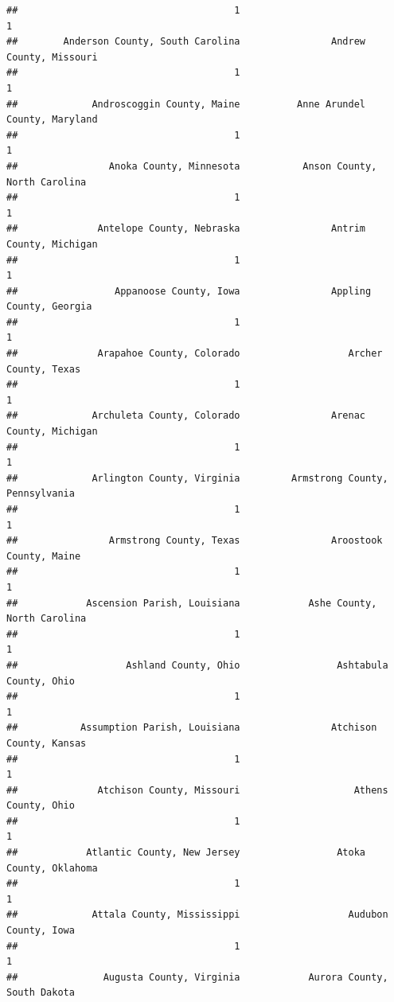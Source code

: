 \documentclass[
]{article}
\begin{document}
\begin{verbatim}
##                                      1                                      1 
##        Anderson County, South Carolina                Andrew County, Missouri 
##                                      1                                      1 
##             Androscoggin County, Maine          Anne Arundel County, Maryland 
##                                      1                                      1 
##                Anoka County, Minnesota           Anson County, North Carolina 
##                                      1                                      1 
##              Antelope County, Nebraska                Antrim County, Michigan 
##                                      1                                      1 
##                 Appanoose County, Iowa                Appling County, Georgia 
##                                      1                                      1 
##              Arapahoe County, Colorado                   Archer County, Texas 
##                                      1                                      1 
##             Archuleta County, Colorado                Arenac County, Michigan 
##                                      1                                      1 
##             Arlington County, Virginia         Armstrong County, Pennsylvania 
##                                      1                                      1 
##                Armstrong County, Texas                Aroostook County, Maine 
##                                      1                                      1 
##            Ascension Parish, Louisiana            Ashe County, North Carolina 
##                                      1                                      1 
##                   Ashland County, Ohio                 Ashtabula County, Ohio 
##                                      1                                      1 
##           Assumption Parish, Louisiana                Atchison County, Kansas 
##                                      1                                      1 
##              Atchison County, Missouri                    Athens County, Ohio 
##                                      1                                      1 
##            Atlantic County, New Jersey                 Atoka County, Oklahoma 
##                                      1                                      1 
##             Attala County, Mississippi                   Audubon County, Iowa 
##                                      1                                      1 
##               Augusta County, Virginia            Aurora County, South Dakota 

\end{verbatim}
\end{document}
